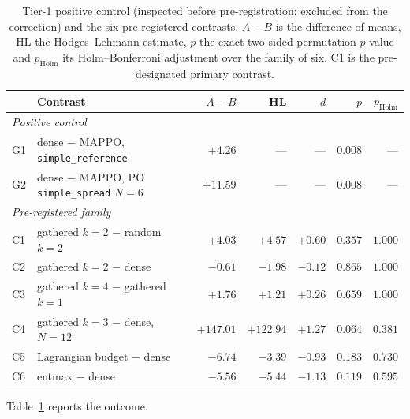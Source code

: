 \begin{table}[t]
\centering
\small
\caption{Tier-1 positive control (inspected before pre-registration; excluded
from the correction) and the six pre-registered contrasts. $A-B$ is the
difference of means, HL the Hodges--Lehmann estimate, $p$ the exact two-sided
permutation $p$-value and $p_{\text{Holm}}$ its Holm--Bonferroni adjustment
over the family of six. C1 is the pre-designated primary contrast.}
\label{tab:training}
\begin{tabular}{llrrrrr}
\toprule
& \textbf{Contrast} & $A-B$ & HL & $d$ & $p$ & $p_{\text{Holm}}$ \\
\midrule
\multicolumn{7}{l}{\emph{Positive control}} \\
G1 & dense $-$ MAPPO, \texttt{simple\_reference} & $+4.26$ & --- & --- & $0.008$ & --- \\
G2 & dense $-$ MAPPO, PO \texttt{simple\_spread} $N{=}6$ & $+11.59$ & --- & --- & $0.008$ & --- \\
\midrule
\multicolumn{7}{l}{\emph{Pre-registered family}} \\
C1 & gathered $k{=}2$ $-$ random $k{=}2$ & $+4.03$ & $+4.57$ & $+0.60$ & $0.357$ & $1.000$ \\
C2 & gathered $k{=}2$ $-$ dense & $-0.61$ & $-1.98$ & $-0.12$ & $0.865$ & $1.000$ \\
C3 & gathered $k{=}4$ $-$ gathered $k{=}1$ & $+1.76$ & $+1.21$ & $+0.26$ & $0.659$ & $1.000$ \\
C4 & gathered $k{=}3$ $-$ dense, $N{=}12$ & $+147.01$ & $+122.94$ & $+1.27$ & $0.064$ & $0.381$ \\
C5 & Lagrangian budget $-$ dense & $-6.74$ & $-3.39$ & $-0.93$ & $0.183$ & $0.730$ \\
C6 & entmax $-$ dense & $-5.56$ & $-5.44$ & $-1.13$ & $0.119$ & $0.595$ \\
\bottomrule
\end{tabular}
\end{table}

Table~\ref{tab:training} reports the outcome.

